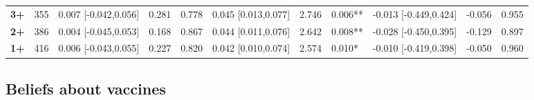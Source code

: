 \documentclass[authordate, empirical]{jote-new-article}
\begin{document}
\begin{table}
\begin{fullwidth}
{\begin{tabular}{@{} l l l l l l l l l l l @{}}
        \textbf{3+}                                       & 355        & 0.007 [-0.042,0.056]                            & 0.281                 & 0.778    &
        0.045 [0.013,0.077]                               & 2.746      & 0.006**                                         & -0.013 [-0.449,0.424] & -0.056   &
        0.955                                                                                                                                                                                                                               \\

        \textbf{2+}                                       & 386        & 0.004 [-0.045,0.053]                            & 0.168                 & 0.867    &
        0.044 [0.011,0.076]                               & 2.642      & 0.008**                                         & -0.028 [-0.450,0.395] & -0.129   &
        0.897                                                                                                                                                                                                                               \\

        \textbf{1+}                                       & 416        & 0.006 [-0.043,0.055]                            & 0.227                 & 0.820    &
        0.042 [0.010,0.074]                               & 2.574      & 0.010*                                          & -0.010 [-0.419,0.398] & -0.050   &
        0.960                                                                                                                                                                                                                               \\
      \end{tabular}}
  \end{fullwidth}
\end{table}









\subsection{Beliefs about vaccines}
\end{document}
